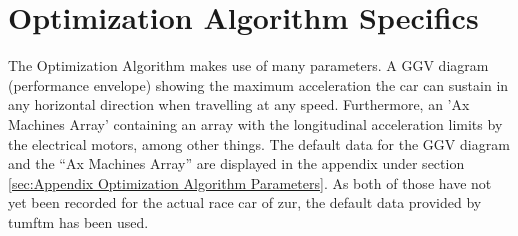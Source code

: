 \section{Optimization Algorithm Specifics}
The Optimization Algorithm makes use of many parameters. A GGV diagram (performance envelope) showing the maximum acceleration the car can sustain in any horizontal direction when travelling at any speed. Furthermore, an 'Ax Machines Array' containing an array with the longitudinal acceleration limits by the electrical motors, among other things. The default data for the GGV diagram and the ``Ax Machines Array'' are displayed in the appendix under section \ref{sec:Appendix Optimization Algorithm Parameters}. As both of those have not yet been recorded for the actual race car of \acrshort{zur}, the default data provided by \acrshort{tumftm} has been used.

